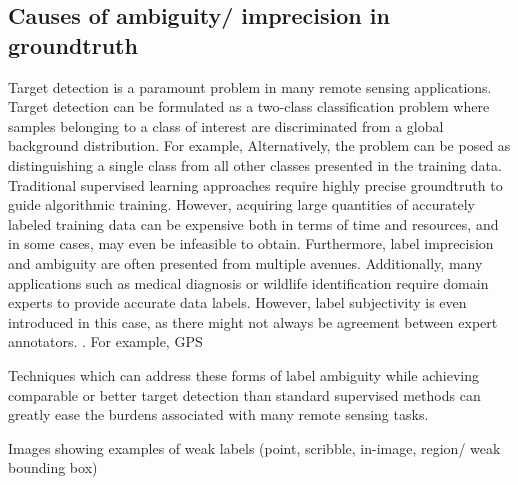 \subsection{Causes of ambiguity/ imprecision in groundtruth}
Target detection is a paramount problem in many remote sensing applications.  Target detection can be formulated as a two-class classification problem where samples belonging to a class of interest are discriminated from a global background distribution.  For example,  Alternatively, the problem can be posed as distinguishing a single class from all other classes presented in the training data.  Traditional supervised learning approaches require highly precise groundtruth to guide algorithmic training.  However, acquiring large quantities  of accurately labeled training data can be expensive both in terms of time and resources, and in some cases, may even be infeasible to obtain.  Furthermore, label imprecision and ambiguity are often presented from multiple avenues. Additionally, many applications such as medical diagnosis or wildlife identification require domain experts to provide accurate data labels.  However, label subjectivity is even introduced in this  case, as there might not always be agreement between expert annotators.   .  For example, GPS

Techniques which can address these forms of label ambiguity while achieving comparable or better target detection than standard supervised methods can greatly ease the burdens associated with many remote sensing tasks. 

Images showing examples of weak labels (point, scribble, in-image, region/ weak bounding box)


